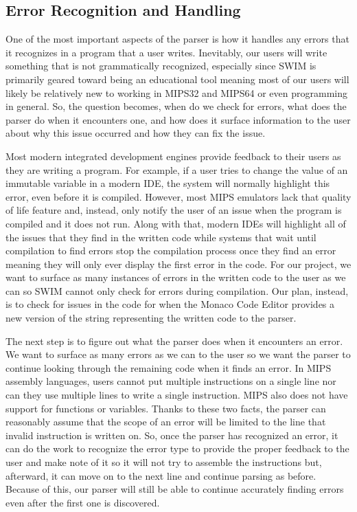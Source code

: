\documentclass[
    parskip=half,
    fontsize=12pt,
    titlepage=firstiscover,
    toc=bibliography,
    numbers=endperiod
]{scrartcl}
\begin{document}
\subsection{Error Recognition and Handling}

One of the most important aspects of the parser is how it handles any
errors that it recognizes in a program that a user writes. Inevitably,
our users will write something that is not grammatically recognized,
especially since SWIM is primarily geared toward being an educational
tool meaning most of our users will likely be relatively new to working
in MIPS32 and MIPS64 or even programming in general. So, the question
becomes, when do we check for errors, what does the parser do when it
encounters one, and how does it surface information to the user about
why this issue occurred and how they can fix the issue.

Most modern integrated development engines provide feedback to their
users as they are writing a program. For example, if a user tries to
change the value of an immutable variable in a modern IDE, the system
will normally highlight this error, even before it is compiled. However,
most MIPS emulators lack that quality of life feature and, instead, only
notify the user of an issue when the program is compiled and it does not
run. Along with that, modern IDEs will highlight all of the issues that
they find in the written code while systems that wait until compilation
to find errors stop the compilation process once they find an error
meaning they will only ever display the first error in the code. For our
project, we want to surface as many instances of errors in the written
code to the user as we can so SWIM cannot only check for errors during
compilation. Our plan, instead, is to check for issues in the code for
when the Monaco Code Editor provides a new version of the string
representing the written code to the parser.

The next step is to figure out what the parser does when it encounters
an error. We want to surface as many errors as we can to the user so we
want the parser to continue looking through the remaining code when it
finds an error. In MIPS assembly languages, users cannot put multiple
instructions on a single line nor can they use multiple lines to write a
single instruction. MIPS also does not have support for functions or
variables. Thanks to these two facts, the parser can reasonably assume
that the scope of an error will be limited to the line that invalid
instruction is written on. So, once the parser has recognized an error,
it can do the work to recognize the error type to provide the proper
feedback to the user and make note of it so it will not try to assemble
the instructions but, afterward, it can move on to the next line and
continue parsing as before. Because of this, our parser will still be
able to continue accurately finding errors even after the first one is
discovered.
\end{document}
